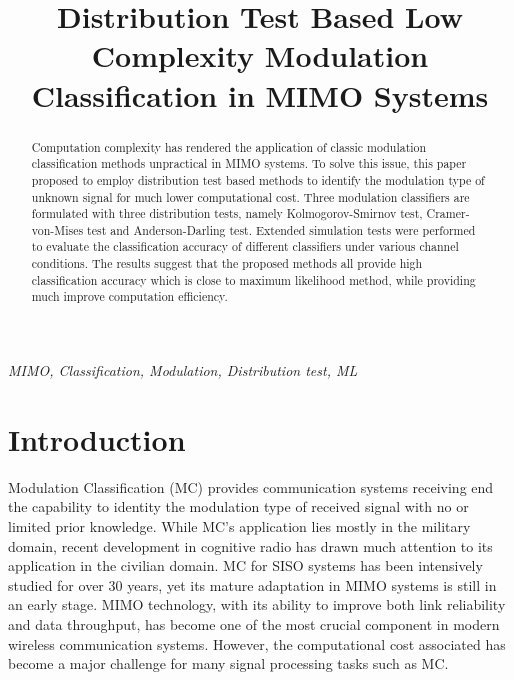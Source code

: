 \documentclass[conference]{IEEEtran}
\begin{document}
\title{Distribution Test Based Low Complexity Modulation Classification in MIMO Systems}

\author{
\and
{}
}

\maketitle

\begin{abstract}
Computation complexity has rendered the application of classic modulation classification methods unpractical in MIMO systems. To solve this issue, this paper proposed to employ distribution test based methods to identify the modulation type of unknown signal for much lower computational cost. Three modulation classifiers are formulated with three distribution tests, namely Kolmogorov-Smirnov test, Cramer-von-Mises test and Anderson-Darling test. Extended simulation tests were performed to evaluate the classification accuracy of different classifiers under various channel conditions. The results suggest that the proposed methods all provide high classification accuracy which is close to maximum likelihood method, while providing much improve computation efficiency.
\end{abstract}

\begin{IEEEkeywords}
\emph{MIMO, Classification, Modulation, Distribution test, ML}
\end{IEEEkeywords}

\IEEEpeerreviewmaketitle

\section{Introduction}
Modulation Classification (MC) provides communication systems receiving end the capability to identity the modulation type of received signal with no or limited prior knowledge. While MC's application lies mostly in the military domain, recent development in cognitive radio has drawn much attention to its application in the civilian domain. MC for SISO systems has been intensively studied for over 30 years, yet its mature adaptation in MIMO systems is still in an early stage. MIMO technology, with its ability to improve both link reliability and data throughput, has become one of the most crucial component in modern wireless communication systems. However, the computational cost associated has become a major challenge for many signal processing tasks such as MC.
\end{document}

